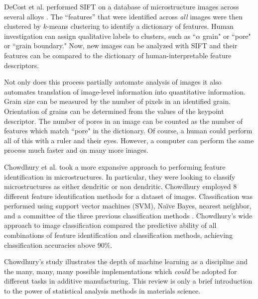 DeCost et al. performed SIFT on a database of microstructure images across several alloys \cite{DeCost2015}. The ``features'' that were identified across \textit{all} images were then clustered by $k$-means clustering to identify a dictionary of features. Human investigation can assign qualitative labels to clusters, such as ``$\alpha$ grain" or ``pore" or ``grain boundary." Now, new images can be analyzed with SIFT and their features can be compared to the dictionary of human-interpretable feature descriptors. 

Not only does this process partially automate analysis of images it also automates translation of image-level information into quantitative information. Grain size can be measured by the number of pixels in an identified grain. Orientation of grains can be determined from the values of the keypoint descriptor. The number of pores in an image can be counted as the number of features which match ``pore" in the dictionary. Of course, a human could perform all of this with a ruler and their eyes. However, a computer can perform the same process much faster and on many more images.

Chowdhury et al. took a more expansive approach to performing feature identification in microstructures. In particular, they were looking to classify microstructures as either dendritic or non dendritic. Chowdhury employed 8 different feature identification methods for a dataset of images. Classification was performed using support vector machines (SVM), Na\"ive Bayes, nearest neighbor, and a committee of the three previous classification methods \cite{Chowdhury2016}. Chowdhury's wide approach to image classification compared the predictive ability of all combinations of feature identification and classification methods, achieving classification accuracies above 90\%.

Chowdhury's study illustrates the depth of machine learning as a discipline and the many, many, many possible implementations which \textit{could} be adopted for different tasks in additive manufacturing. This review is only a brief introduction to the power of statistical analysis methods in materials science. 


